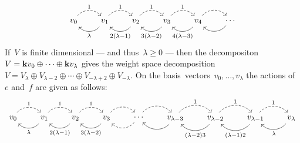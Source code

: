 \begin{theorem}
\begin{enumerate}
\begin{equation}
        \begin{tikzcd}[column sep = 2em]
          v_0
          \arrow[dashed, bend left = 50]{r}[above]{1}
          &
          v_1
          \arrow[dashed, bend left = 50]{r}[above]{1}
          \arrow[bend left = 50]{l}[below]{\lambda}
          &
          v_2
          \arrow[dashed, bend left = 50]{r}[above]{1}
          \arrow[bend left = 50]{l}[below]{2(\lambda-1)}
          &
          v_3
          \arrow[dashed, bend left = 50]{r}[above]{1}
          \arrow[bend left = 50]{l}[below]{3(\lambda-2)}
          &
          v_4
          \arrow[dashed, bend left = 50]{r}
          \arrow[bend left = 50]{l}[below]{4(\lambda-3)}
          &
          \dotsb
          \arrow[bend left = 50]{l}
        \end{tikzcd}
      \end{equation}
      If~$V$ is finite dimensional --- and thus~$\lambda \geq 0$ --- then the decompositon~$V = \mathbf{k} v_0 \oplus \dotsb \oplus \mathbf{k} v_\lambda$ gives the weight space decomposition~$V = V_{\lambda} \oplus V_{\lambda-2} \oplus \dotsb \oplus V_{-\lambda+2} \oplus V_{-\lambda}$.
      On the basis~vectors~$v_0, \dotsc, v_\lambda$ the actions of~$e$ and~$f$ are given as follows:
      \begin{equation}
        \label{picture of finite dimensional verma irrep}
        \begin{tikzcd}[column sep = 2em]
          v_0
          \arrow[dashed, bend left = 50]{r}[above]{1}
          &
          v_1
          \arrow[dashed, bend left = 50]{r}[above]{1}
          \arrow[bend left = 50]{l}[below]{\lambda}
          &
          v_2
          \arrow[dashed, bend left = 50]{r}[above]{1}
          \arrow[bend left = 50]{l}[below]{2(\lambda-1)}
          &
          v_3
          \arrow[dashed, bend left = 50]{r}
          \arrow[bend left = 50]{l}[below]{3(\lambda-2)}
          &
          \dotsb
          \arrow[dashed, bend left = 50]{r}
          \arrow[dashed, bend left = 50]{l}
          &
          v_{\lambda-3}
          \arrow[dashed, bend left = 50]{r}[above]{1}
          \arrow[bend left = 50]{l}
          &
          v_{\lambda-2}
          \arrow[dashed, bend left = 50]{r}[above]{1}
          \arrow[bend left = 50]{l}[below]{(\lambda-2)3}
          &
          v_{\lambda-1}
          \arrow[dashed, bend left = 50]{r}[above]{1}
          \arrow[bend left = 50]{l}[below]{(\lambda-1)2}
          &
          v_{\lambda}
          \arrow[bend left = 50]{l}[below]{\lambda}
        \end{tikzcd}
      \end{equation}

\end{enumerate}
\end{theorem}
